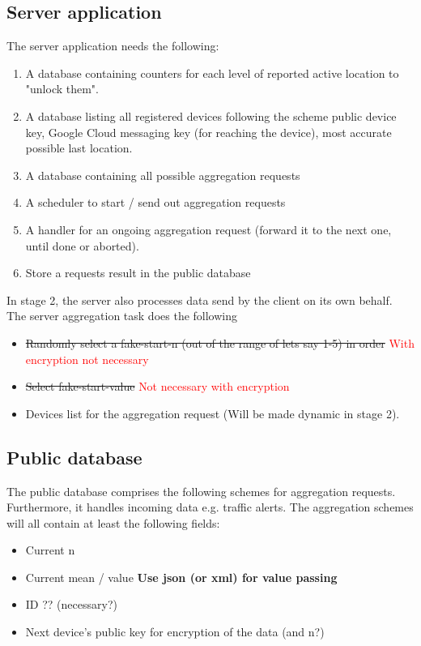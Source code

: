 \subsection{Server application}
The server application needs the following:
\begin{enumerate}
	\item A database containing counters for each level of reported active location to "unlock them".
	\item A database listing all registered devices following the scheme {public device key, Google Cloud messaging key (for reaching the device), most accurate possible last location}.
	\item A database containing all possible aggregation requests
	\item A scheduler to start / send out aggregation requests
	\item A handler for an ongoing aggregation request (forward it to the next one, until done or aborted).
	\item Store a requests result in the public database
\end{enumerate}
In stage 2, the server also processes data send by the client on its own behalf.
The server aggregation task does the following
\begin{itemize}
	\item \sout{Randomly select a fake-start-n (out of the range of lets say 1-5) in order } \textcolor{red}{With encryption not necessary}
	\item \sout{Select fake-start-value} \textcolor{red}{Not necessary with encryption}
	\item Devices list for the aggregation request (Will be made dynamic in stage 2).
\end{itemize}

\subsection{Public database}
The public database comprises the following schemes for aggregation requests.
Furthermore, it handles incoming data e.g. traffic alerts.
The aggregation schemes will all contain at least the following fields:
\begin{itemize}
	\item Current n
	\item Current mean / value \textbf{Use json (or xml) for value passing}
	\item ID ?? (necessary?)
	\item Next device's public key for encryption of the data (and n?)
\end{itemize}

